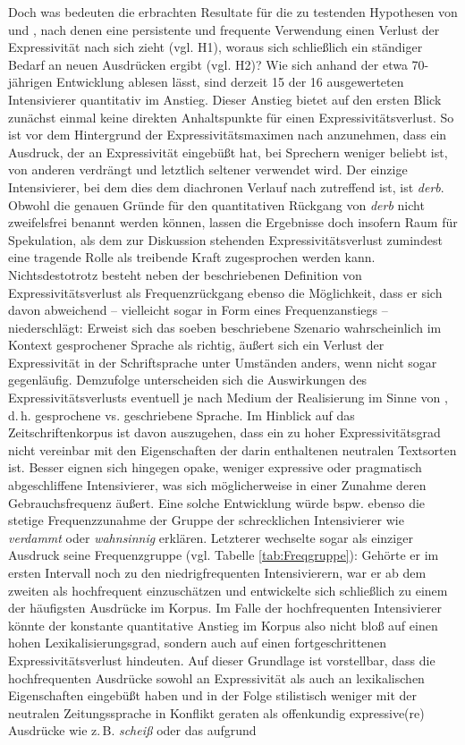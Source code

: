 Doch was bedeuten die erbrachten Resultate für die zu testenden Hypothesen von \citet[2]{Hauschild.1899} und \citet[274]{Baumgarten.1908}, nach denen eine persistente und frequente Verwendung einen Verlust der Expressivität nach sich zieht (vgl. H1), woraus sich schließlich ein ständiger Bedarf an neuen Ausdrücken ergibt (vgl. H2)? Wie sich anhand der etwa 70-jährigen Entwicklung ablesen lässt, sind derzeit 15 der 16 ausgewerteten Intensivierer quantitativ im Anstieg. Dieser Anstieg bietet auf den ersten Blick zunächst einmal keine direkten Anhaltspunkte für einen Expressivitätsverlust. So ist vor dem Hintergrund der Expressivitätsmaximen nach \mbox{\citet[]{Kirschbaum.2002b}} anzunehmen, dass ein Ausdruck, der an Expressivität eingebüßt hat, bei Sprechern weniger beliebt ist, von anderen verdrängt und letztlich seltener verwendet wird. Der einzige Intensivierer, bei dem dies dem diachronen Verlauf nach zutreffend ist, ist \textit{derb}. Obwohl die genauen Gründe für den quantitativen Rückgang von \textit{derb} nicht zweifelsfrei benannt werden können, lassen die Ergebnisse doch insofern Raum für Spekulation, als dem zur Diskussion stehenden Expressivitätsverlust zumindest eine tragende Rolle als treibende Kraft zugesprochen werden kann. Nichtsdestotrotz besteht neben der beschriebenen Definition von Expressivitätsverlust als Frequenzrückgang ebenso die Möglichkeit, dass er sich davon abweichend -- vielleicht sogar in Form eines Frequenzanstiegs -- niederschlägt: Erweist sich das soeben beschriebene Szenario wahrscheinlich im Kontext gesprochener Sprache als richtig, äußert sich ein Verlust der Expressivität in der Schriftsprache unter Umständen anders, wenn nicht sogar gegenläufig. Demzufolge unterscheiden sich die Auswirkungen des Expressivitätsverlusts eventuell je nach Medium der Realisierung im Sinne von \mbox{\citet[]{Koch.1996,Koch.2007}}, d.\,h. gesprochene vs. geschriebene Sprache. Im Hinblick auf das Zeitschriftenkorpus ist davon auszugehen, dass ein zu hoher Expressivitätsgrad nicht vereinbar mit den Eigenschaften der darin enthaltenen neutralen Textsorten ist. Besser eignen sich hingegen opake, weniger expressive oder pragmatisch abgeschliffene Intensivierer, was sich möglicherweise in einer Zunahme deren Gebrauchsfrequenz äußert. Eine solche Entwicklung würde bspw. ebenso die stetige Frequenzzunahme der Gruppe der \glqq{}schrecklichen\grqq{} Intensivierer wie \textit{verdammt} oder \textit{wahnsinnig} erklären. Letzterer wechselte sogar als einziger Ausdruck seine Frequenzgruppe (vgl. Tabelle \ref{tab:Freqgruppe}): Gehörte er im ersten Intervall noch zu den niedrigfrequenten Intensivierern, war er ab dem zweiten als hochfrequent einzuschätzen und entwickelte sich schließlich zu einem der häufigsten Ausdrücke im Korpus. Im Falle der hochfrequenten Intensivierer könnte der konstante quantitative Anstieg im Korpus also nicht bloß auf einen hohen Lexikalisierungsgrad, sondern auch auf einen fortgeschrittenen Expressivitätsverlust hindeuten. Auf dieser Grundlage ist vorstellbar, dass die hochfrequenten Ausdrücke sowohl an Expressivität als auch an lexikalischen Eigenschaften eingebüßt haben und in der Folge stilistisch weniger mit der neutralen Zeitungssprache in Konflikt geraten als offenkundig expressive(re) Ausdrücke wie z.\,B. \textit{scheiß} oder das aufgrund 